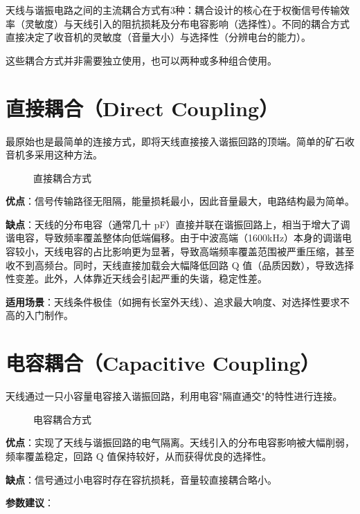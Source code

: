 \documentclass[12pt,UTF8]{ctexbook}
\begin{document}
天线与谐振电路之间的主流耦合方式有3种：耦合设计的核心在于权衡信号传输效率（灵敏度）与天线引入的阻抗损耗及分布电容影响（选择性）。不同的耦合方式直接决定了收音机的灵敏度（音量大小）与选择性（分辨电台的能力）。

这些耦合方式并非需要独立使用，也可以两种或多种组合使用。

\section{直接耦合（Direct Coupling）}

最原始也是最简单的连接方式，即将天线直接接入谐振回路的顶端。简单的矿石收音机多采用这种方法。

\begin{figure}[H]
	\centering
	\caption{直接耦合方式}
	\label{fig:direct-coupling}
\end{figure}

\textbf{优点}：信号传输路径无阻隔，能量损耗最小，因此音量最大，电路结构最为简单。

\textbf{缺点}：天线的分布电容（通常几十 pF）直接并联在谐振回路上，相当于增大了调谐电容，导致频率覆盖整体向低端偏移。由于中波高端（1600kHz）本身的调谐电容较小，天线电容的占比影响更为显著，导致高端频率覆盖范围被严重压缩，甚至收不到高频台。同时，天线直接加载会大幅降低回路 Q 值（品质因数），导致选择性变差。此外，人体靠近天线会引起严重的失谐，稳定性差。

\textbf{适用场景}：天线条件极佳（如拥有长室外天线）、追求最大响度、对选择性要求不高的入门制作。

\section{电容耦合（Capacitive Coupling）}

天线通过一只小容量电容接入谐振回路，利用电容"隔直通交"的特性进行连接。

\begin{figure}[H]
	\centering
	\caption{电容耦合方式}
	\label{fig:capacitive-coupling}
\end{figure}

\textbf{优点}：实现了天线与谐振回路的电气隔离。天线引入的分布电容影响被大幅削弱，频率覆盖稳定，回路 Q 值保持较好，从而获得优良的选择性。

\textbf{缺点}：信号通过小电容时存在容抗损耗，音量较直接耦合略小。

\textbf{参数建议}：
\end{document}
